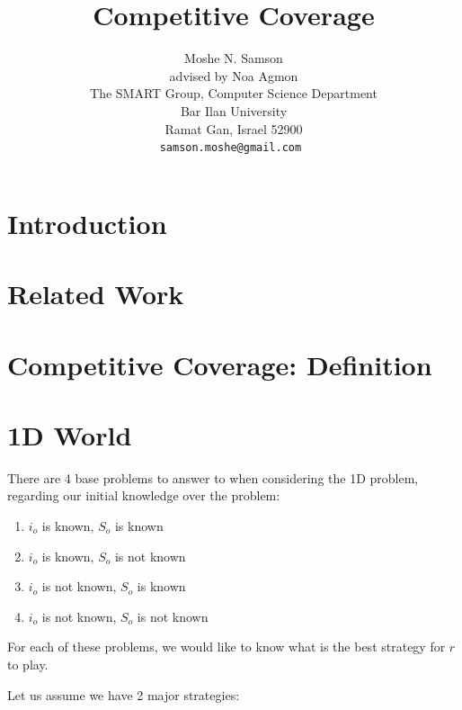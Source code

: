 \documentclass[a4paper,10pt]{article}
\newcommand\rob{\ensuremath{r}\xspace}
\newcommand\opp{\ensuremath{o}\xspace}
\begin{document}
\title{Competitive Coverage}
\author{Moshe N. Samson\\
advised by Noa Agmon\\
The SMART Group, Computer Science Department\\
Bar Ilan University\\
Ramat Gan, Israel 52900\\
\tt\small samson.moshe@gmail.com
}



\tableofcontents
\maketitle

\section{Introduction}


\section{Related Work}


\section{Competitive Coverage: Definition}

\section{1D World}

There are 4 base problems to answer to when considering the 1D problem, regarding our initial knowledge over the problem:

\begin{enumerate}
\item $i_{\opp}$ is known, $S_{\opp}$ is known
\item $i_{\opp}$ is known, $S_{\opp}$ is not known
\item $i_{\opp}$ is not known, $S_{\opp}$ is known
\item $i_{\opp}$ is not known, $S_{\opp}$ is not known
\end{enumerate}

For each of these problems, we would like to know what is the best strategy for \rob to play.

Let us assume we have 2 major strategies:
\end{document}
